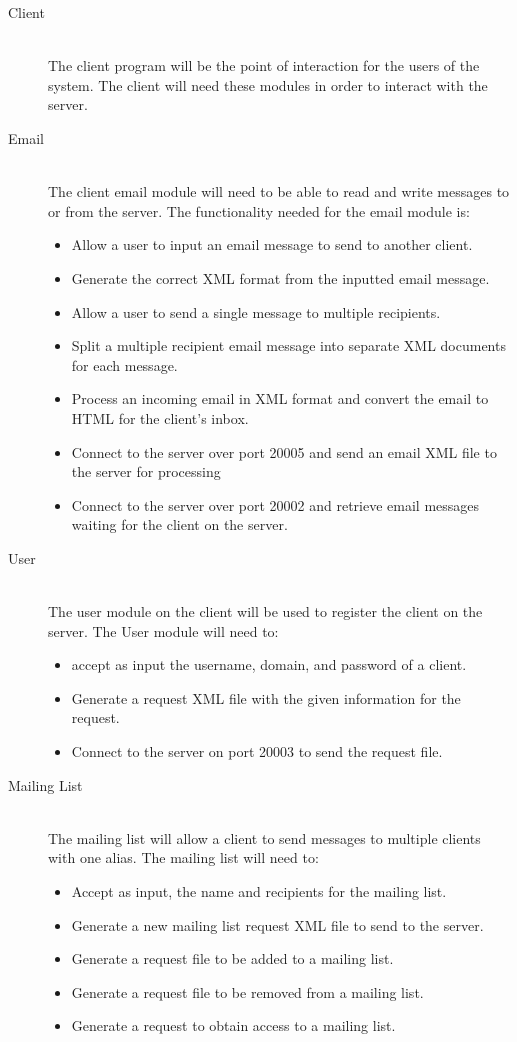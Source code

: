 \documentclass[11pt, letterpaper]{report}
\begin{document}
\begin{description}
\item[\large Client]\hfill \\
The client program will be the point of interaction for the users of the system. The client will need these modules in order to interact with the server.
\item[Email]\hfill \\
The client email module will need to be able to read and write messages to or from the server. The functionality needed for the email module is:
\begin{itemize}
\item Allow a user to input an email message to send to another client.
\item Generate the correct XML format from the inputted email message.
\item Allow a user to send a single message to multiple recipients.
\item Split a multiple recipient email message into separate XML documents for each message.
\item Process an incoming email in XML format and convert the email to HTML for the client's inbox.
\item Connect to the server over port 20005 and send an email XML file to the server for processing
\item Connect to the server over port 20002 and retrieve email messages waiting for the client on the server. 
\end{itemize}
\item[User]\hfill \\
The user module on the client will be used to register the client on the server. The User module will need to:
\begin{itemize}
\item accept as input the username, domain, and password of a client.
\item Generate a request XML file with the given information for the request.
\item Connect to the server on port 20003 to send the request file.
\end{itemize}
\item[Mailing List]\hfill \\
The mailing list will allow a client to send messages to multiple clients with one alias. The mailing list will need to:
\begin{itemize}
\item Accept as input, the name and recipients for the mailing list.
\item Generate a new mailing list request XML file to send to the server.
\item Generate a request file to be added to a mailing list.
\item Generate a request file to be removed from a mailing list.
\item Generate a request to obtain access to a mailing list.
\end{itemize}


\end{description}
\end{document}
